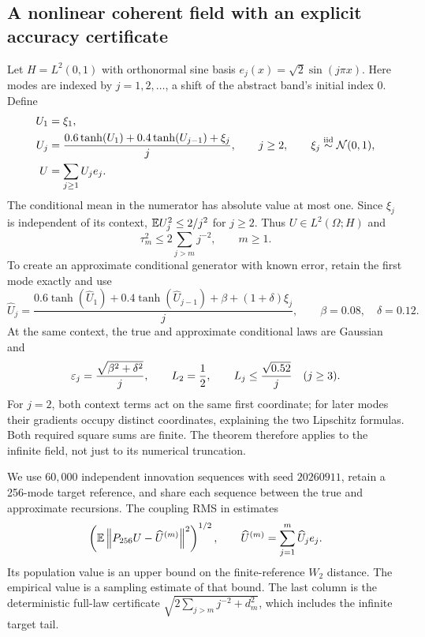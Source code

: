 \subsection{A nonlinear coherent field with an explicit accuracy certificate}
Let $H=L^2(0,1)$ with orthonormal sine basis $e_j(x)=\sqrt2\sin(j\pi x)$. Here modes are indexed by $j=1,2,\ldots$, a shift of the abstract band's initial index $0$. Define
\begin{align}\label{eq:synthetic-field}
 U_1&=\xi_1,\\
 U_j&=\frac{0.6\tanh(U_1)+0.4\tanh(U_{j-1})+\xi_j}{j},
 \qquad j\ge2,\qquad \xi_j\overset{\mathrm{iid}}\sim\mathcal N(0,1),\notag\\
 U&=\sum_{j\ge1}U_je_j.\notag
\end{align}
The conditional mean in the numerator has absolute value at most one. Since $\xi_j$ is independent of its context, $\mathbb E U_j^2\le2/j^2$ for $j\ge2$. Thus $U\in L^2(\Omega;H)$ and
\begin{equation}\label{eq:synthetic-tail}
 \tau_m^2\le2\sum_{j>m}j^{-2},\qquad m\ge1.
\end{equation}
To create an approximate conditional generator with known error, retain the first mode exactly and use
\begin{equation}\label{eq:perturbed-field}
 \widehat U_j=
 \frac{0.6\tanh(\widehat U_1)+0.4\tanh(\widehat U_{j-1})+\beta+(1+\delta)\xi_j}{j},
 \qquad \beta=0.08,\quad\delta=0.12.
\end{equation}
At the same context, the true and approximate conditional laws are Gaussian and
\begin{equation}\label{eq:synthetic-constants}
 \varepsilon_j=\frac{\sqrt{\beta^2+\delta^2}}{j},\qquad
 L_2=\frac12,\qquad L_j\le\frac{\sqrt{0.52}}{j}\quad(j\ge3).
\end{equation}
For $j=2$, both context terms act on the same first coordinate; for later modes their gradients occupy distinct coordinates, explaining the two Lipschitz formulas. Both required square sums are finite. The theorem therefore applies to the infinite field, not just to its numerical truncation.

We use $60{,}000$ independent innovation sequences with seed $20260911$, retain a 256-mode target reference, and share each sequence between the true and approximate recursions. The coupling RMS in  estimates
\begin{equation}\label{eq:coupling-mc}
 \left(\mathbb E\left\lVert P_{256}U-\widehat U^{(m)}\right\rVert^2\right)^{1/2},
 \qquad \widehat U^{(m)}=\sum_{j=1}^m\widehat U_je_j.
\end{equation}
Its population value is an upper bound on the finite-reference $W_2$ distance. The empirical value is a sampling estimate of that bound. The last column is the deterministic full-law certificate $\sqrt{2\sum_{j>m}j^{-2}+d_m^2}$, which includes the infinite target tail.

